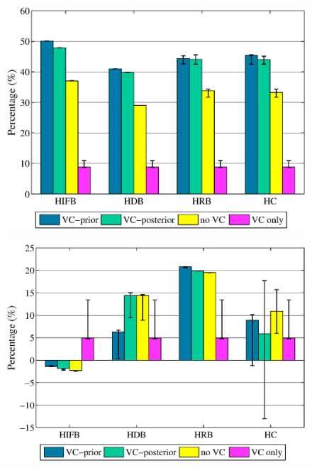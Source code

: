 \begin{figure}[!htb]
	\centering
	\includegraphics[width=1.0\linewidth]{figures/evaluation/vc_montage2.eps}
	\label{fig:evaluation_vc_montage}
\end{figure}

\begin{figure}[!htb]
	\centering
	\includegraphics[width=1.0\linewidth]{figures/evaluation/vc_genome2.eps}
	\label{fig:evaluation_vc_genome}
\end{figure}

